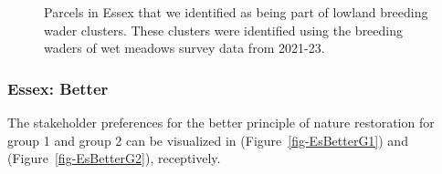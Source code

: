 \documentclass[
  12pt,
  letterpaper,
  DIV=11,
  numbers=noendperiod]{scrartcl}
\begin{document}
\begin{figure}[H]


\caption{\label{fig-EssexLawton}Parcels in Essex that we identified as
being part of lowland breeding wader clusters. These clusters were
identified using the breeding waders of wet meadows survey data from
2021-23.}

\end{figure}%

\newpage{}

\subsubsection{Essex: Better}\label{essex-better}

The stakeholder preferences for the better principle of nature
restoration for group 1 and group 2 can be visualized in
(Figure~\ref{fig-EsBetterG1}) and (Figure~\ref{fig-EsBetterG2}),
receptively.
\end{document}
